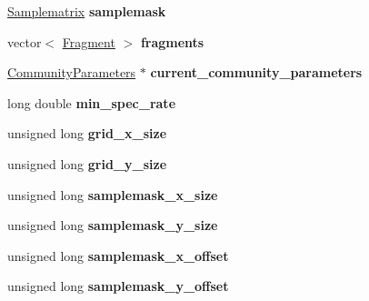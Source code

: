 \begin{DoxyCompactItemize}
\item 
\hyperlink{class_samplematrix}{Samplematrix} {\bfseries samplemask}\hypertarget{class_community_ac7434119a77086e3b38a4a94c8fbff01}{}\label{class_community_ac7434119a77086e3b38a4a94c8fbff01}

\item 
vector$<$ \hyperlink{struct_fragment}{Fragment} $>$ {\bfseries fragments}\hypertarget{class_community_a8a17909b92a0cec3b63cec41e92796cb}{}\label{class_community_a8a17909b92a0cec3b63cec41e92796cb}

\item 
\hyperlink{struct_community_parameters}{Community\+Parameters} $\ast$ {\bfseries current\+\_\+community\+\_\+parameters}\hypertarget{class_community_a77e925f82bee5441d8ec45406066dcfb}{}\label{class_community_a77e925f82bee5441d8ec45406066dcfb}

\item 
long double {\bfseries min\+\_\+spec\+\_\+rate}\hypertarget{class_community_a9dc6f7d4ab75b382be85c2b74edac6b7}{}\label{class_community_a9dc6f7d4ab75b382be85c2b74edac6b7}

\item 
unsigned long {\bfseries grid\+\_\+x\+\_\+size}\hypertarget{class_community_a383dba82c8c76bf5c130c2bf4ac057e5}{}\label{class_community_a383dba82c8c76bf5c130c2bf4ac057e5}

\item 
unsigned long {\bfseries grid\+\_\+y\+\_\+size}\hypertarget{class_community_a308d12fa4ef95015860d4181b075c93f}{}\label{class_community_a308d12fa4ef95015860d4181b075c93f}

\item 
unsigned long {\bfseries samplemask\+\_\+x\+\_\+size}\hypertarget{class_community_a960bb6bb58eaec017d36d16cb3a3bc8a}{}\label{class_community_a960bb6bb58eaec017d36d16cb3a3bc8a}

\item 
unsigned long {\bfseries samplemask\+\_\+y\+\_\+size}\hypertarget{class_community_a10722b2fe8855460946f04f0ae69fd74}{}\label{class_community_a10722b2fe8855460946f04f0ae69fd74}

\item 
unsigned long {\bfseries samplemask\+\_\+x\+\_\+offset}\hypertarget{class_community_ac4985481c86bd62a50fa946699867216}{}\label{class_community_ac4985481c86bd62a50fa946699867216}

\item 
unsigned long {\bfseries samplemask\+\_\+y\+\_\+offset}\hypertarget{class_community_aeaebe975a46d62b70380e50ff7ebd09a}{}\label{class_community_aeaebe975a46d62b70380e50ff7ebd09a}


\end{DoxyCompactItemize}
